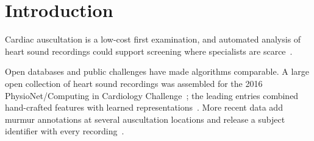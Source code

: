 
\ornekuyarisi  %

\section{Introduction}
\label{sec:intro}

Cardiac auscultation is a low-cost first examination, and automated analysis of heart sound
recordings could support screening where specialists are scarce~\cite{Liu2016}.

Open databases and public challenges have made algorithms comparable. A large open collection of
heart sound recordings was assembled for the 2016 PhysioNet/Computing in Cardiology
Challenge~\cite{Liu2016,Clifford2016}; the leading entries combined hand-crafted
features with learned representations~\cite{Potes2016}. More recent data add murmur annotations
at several auscultation locations and release a subject identifier with every
recording~\cite{Oliveira2022,Reyna2023}.

